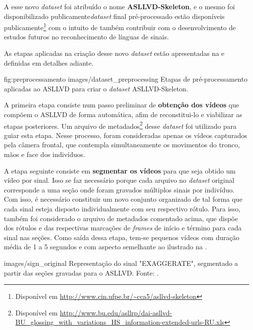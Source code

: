 A esse novo \textit{dataset} foi atribuído o nome \textbf{ASLLVD-Skeleton}, e o mesmo foi disponibilizado publicamente\textit{dataset} final pré-processado estão disponíveis publicamente\footnote{
    Disponível em \url{http://www.cin.ufpe.br/~cca5/asllvd-skeleton}
} com o intuito de também contribuir com o desenvolvimento de estudos futuros no reconhecimento de línguas de sinais.

As etapas aplicadas na criação desse novo \textit{dataset} estão apresentadas na  e definidas em detalhes adiante.

\image
    {fig:preprocessamento}
    {images/dataset_preprocessing}
    {Etapas de pré-processamento aplicadas ao ASLLVD para criar o \textit{dataset} ASLLVD-Skeleton.}

A primeira etapa consiste num passo preliminar de \textbf{obtenção dos vídeos} que compõem o ASLLVD de forma automática, afim de reconstitui-lo e viabilizar as etapas posteriores. Um arquivo de metadados\footnote{
    Disponível em \url{http://www.bu.edu/asllrp/dai-asllvd-BU_glossing_with_variations_HS_information-extended-urls-RU.xls}
} desse \textit{dataset} foi utilizado para guiar esta etapa. Nesse processo, foram consideradas apenas os vídeos capturados pela câmera frontal, que contempla simultaneamente os movimentos do tronco, mãos e face dos indivíduos.

A etapa seguinte consiste em \textbf{segmentar os vídeos} para que seja obtido um vídeo por sinal. Isso se faz necessário porque cada arquivo no \textit{dataset} original corresponde a uma seção onde foram gravados múltiplos sinais por indivíduo. Com isso, é necessário constituir um novo conjunto organizado de tal forma que cada sinal esteja disposto individualmente com seu respectivo rótulo. Para isso, também foi considerado o arquivo de metadados comentado acima, que dispõe dos rótulos e das respectivas marcações de \textit{frames} de início e término para cada sinal nas seções. Como saída dessa etapa, tem-se pequenos vídeos com duração média de 1 a 5 segundos e com aspecto semelhante ao ilustrado na .

    {images/sign_original}
    {Representação do sinal "EXAGGERATE", segmentado a partir das seções gravadas para o ASLLVD. Fonte: \cite{athitsos-asllvd-2008}.}

